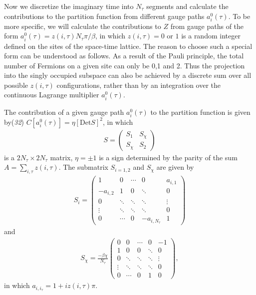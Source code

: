 \documentclass[12pt]{article}
\begin{document}
Now we discretize the imaginary time into $N_{\tau}$ segments and calculate the contributions to the partition function from different gauge paths $a^{0}_{i}(\tau)$. To be more specific, we will calculate the contributions to $Z$ from gauge paths of the form $a^{0}_{i}(\tau)=z(i,\tau) N_{\tau}\pi/\beta$, in which $z(i,\tau)=0$ or $1$ is a random integer defined on the sites of the space-time lattice. The reason to choose such a special form can be understood as follows. As a result of the Pauli principle, the total number of Fermions on a given site can only be 0,1 and 2. Thus the projection into the singly occupied subspace can also be achieved by a discrete sum over all possible $z(i,\tau)$ configurations, rather than by an integration over the continuous Lagrange multiplier $a^{0}_{i}(\tau)$.  

The contribution of a given gauge path $a^{0}_{i}(\tau)$ to the partition function is given by({\it 32\/}) $C[a^{0}_{i}(\tau)]=\eta[\mathrm{Det} S]^{2}$, in which 
\begin{eqnarray}
S=\left(\begin{array}{cc}S_{1} &  S_{\chi} \\S_{\chi} & S_{2} \end{array}\right)\nonumber
\end{eqnarray}
is a $2N_{\tau}\times2N_{\tau}$ matrix, $\eta=\pm1$ is a sign determined by the parity of the sum $A=\sum_{i,\tau}z(i,\tau)$.  The submatrix $S_{i=1,2}$ and $S_{\chi}$ are given by
\begin{eqnarray}
S_{i}=\left(\begin{array}{ccccc}
1 & 0 & \cdots & 0 & a_{i,1} \\ 
-a_{i,2} & 1 & 0 & \ddots & 0 \\ 
0 & \ddots & \ddots & \ddots & \vdots\\ 
\vdots & \ddots & \ddots & \ddots & 0 \\ 
0 & \cdots & 0 & -a_{i,N_{\tau}} & 1 
\end{array}\right)\nonumber
\end{eqnarray} 
and
\begin{eqnarray}
S_{\chi}=\frac{-\beta\chi}{N_{\tau}}\left(\begin{array}{ccccc}
0 & 0 & \cdots & 0 & -1 \\ 
1 & 0 & 0 & \ddots & 0 \\ 
0 & \ddots & \ddots & \ddots & \vdots\\ 
\vdots & \ddots & \ddots & \ddots & 0 \\ 
0 & \cdots & 0 & 1 & 0 
\end{array}\right),\nonumber
\end{eqnarray} 
in which $a_{i,i_{\tau}}=1+iz(i,\tau)\pi$.
\end{document}
